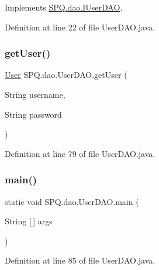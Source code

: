 Implements \mbox{\hyperlink{interface_s_p_q_1_1dao_1_1_i_user_d_a_o_ac53b137d5e0828058457e59fa70c2b95}{S\+P\+Q.\+dao.\+I\+User\+D\+AO}}.



Definition at line 22 of file User\+D\+A\+O.\+java.

\mbox{\label{class_s_p_q_1_1dao_1_1_user_d_a_o_a2fe3e16e787f453b37f061de24cc49eb}} 
\subsubsection{\texorpdfstring{get\+User()}{getUser()}\hspace{0.1cm}{\footnotesize\ttfamily [3/3]}}
{\footnotesize\ttfamily \mbox{\hyperlink{class_s_p_q_1_1data_1_1_user}{User}} S\+P\+Q.\+dao.\+User\+D\+A\+O.\+get\+User (\begin{DoxyParamCaption}\item[{String}]{username,  }\item[{String}]{password }\end{DoxyParamCaption})}



Definition at line 79 of file User\+D\+A\+O.\+java.

\mbox{\label{class_s_p_q_1_1dao_1_1_user_d_a_o_a8f6efdd35a56fedb08c9c9c62586c36b}} 
\subsubsection{\texorpdfstring{main()}{main()}}
{\footnotesize\ttfamily static void S\+P\+Q.\+dao.\+User\+D\+A\+O.\+main (\begin{DoxyParamCaption}\item[{String \mbox{[}$\,$\mbox{]}}]{args }\end{DoxyParamCaption})\hspace{0.3cm}{\ttfamily [static]}}



Definition at line 85 of file User\+D\+A\+O.\+java.

